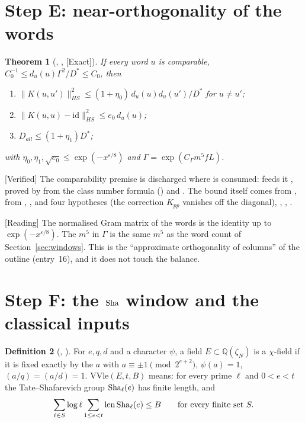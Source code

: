 \documentclass[11pt]{article}
\newcommand{\Exact}{\textcolor{exactc}{\textsf{\small[Exact]}}}
\newcommand{\Verified}{\textcolor{verc}{\textsf{\small[Verified]}}}
\newcommand{\Reading}{\textcolor{readc}{\textsf{\small[Reading]}}}
\newcommand{\eps}{\varepsilon}
\newcommand{\Q}{\mathbb{Q}}
\newcommand{\len}{\operatorname{len}}
\theoremstyle{plain}
\newtheorem{theorem}{Theorem}[section]
\theoremstyle{definition}
\newtheorem{definition}[theorem]{Definition}
\begin{document}
\section{Step E: near-orthogonality of the words}\label{sec:E}

\begin{theorem}[, , \Exact]
If every word $u$ is comparable, $C_0^{-1}\le d_u(u)\Gamma^2/D^*\le C_0$, then
\begin{enumerate}
\item $\|K(u,u')\|_{HS}^2\le(1+\eta_0)\,d_u(u)d_u(u')/D^*$ for $u\neq u'$;
\item $\|K(u,u)-\mathrm{id}\|_{HS}^2\le e_0\,d_u(u)$;
\item $D_{all}\le(1+\eta_1)D^*$;
\end{enumerate}
with $\eta_0,\eta_1,\sqrt{e_0}\le\exp(-x^{\eps/8})$ and $\Gamma=\exp(C_\Gamma m^5fL)$.
\end{theorem}

\Verified{} The comparability premise is discharged where  is consumed:
 feeds it , proved by  from the class
number formula () and . The bound itself comes from
, from , ,  and
four hypotheses  (the correction $K_{pp}$ vanishes off the diagonal),
, , .

\Reading{} The normalised Gram matrix of the words is the identity up to $\exp(-x^{\eps/8})$. The
$m^5$ in $\Gamma$ is the same $m^5$ as the word count of Section~\ref{sec:windows}. This is the
``approximate orthogonality of columns'' of the outline (entry~16), and it does not touch the
balance.

\section{Step F: the $\mathrm{Sha}$ window and the classical inputs}\label{sec:F}

\begin{definition}[, ]
For $e,q,d$ and a character $\psi$, a field $E\subset\Q(\zeta_N)$ is a $\chi$-field if it is fixed
exactly by the $a$ with $a\equiv\pm1\pmod{2^{e+2}}$, $\psi(a)=1$, $(a/q)=(a/d)=1$.
$\mathrm{VVle}(E,t,B)$ means: for every prime $\ell$ and $0<e<t$ the Tate--Shafarevich group
$\mathrm{Sha}_\ell(e)$ has finite length, and
\[
\sum_{\ell\in S}\log\ell\sum_{1\le e<t}\len\Sha_\ell(e)\le B\qquad\text{for every finite set } S.
\]
\end{definition}
\end{document}
